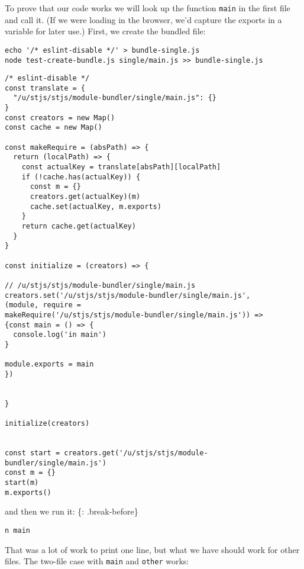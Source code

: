 \documentclass[krantzl]{krantz}
\begin{document}
To prove that our code works
we will look up the function \texttt{main} in the first file and call it.
(If we were loading in the browser,
we'd capture the exports in a variable for later use.)
First, we create the bundled file:


\begin{lstlisting}[frame=single,frameround=tttt]
echo '/* eslint-disable */' > bundle-single.js
node test-create-bundle.js single/main.js >> bundle-single.js
\end{lstlisting}



\begin{lstlisting}[frame=single,frameround=tttt]
/* eslint-disable */
const translate = {
  "/u/stjs/stjs/module-bundler/single/main.js": {}
}
const creators = new Map()
const cache = new Map()

const makeRequire = (absPath) => {
  return (localPath) => {
    const actualKey = translate[absPath][localPath]
    if (!cache.has(actualKey)) {
      const m = {}
      creators.get(actualKey)(m)
      cache.set(actualKey, m.exports)
    }
    return cache.get(actualKey)
  }
}

const initialize = (creators) => {

// /u/stjs/stjs/module-bundler/single/main.js
creators.set('/u/stjs/stjs/module-bundler/single/main.js',
(module, require =
makeRequire('/u/stjs/stjs/module-bundler/single/main.js')) =>
{const main = () => {
  console.log('in main')
}

module.exports = main
})


}

initialize(creators)


const start = creators.get('/u/stjs/stjs/module-bundler/single/main.js')
const m = {}
start(m)
m.exports()
\end{lstlisting}



\noindent and then we run it:
\{: .break-before\}


\begin{lstlisting}[frame=single,frameround=tttt]
n main
\end{lstlisting}



That was a lot of work to print one line,
but what we have should work for other files.
The two-file case with \texttt{main} and \texttt{other} works:
\end{document}
